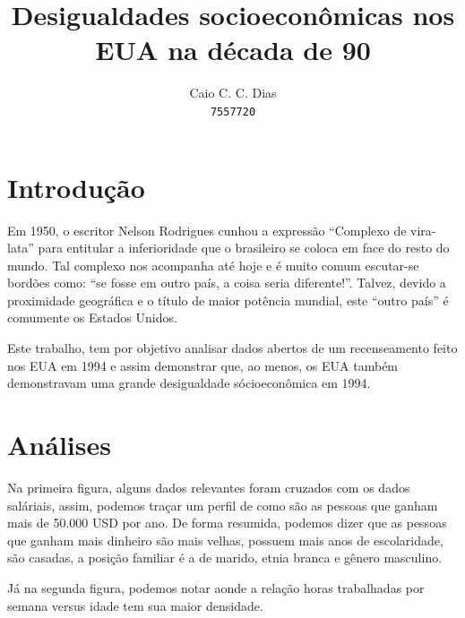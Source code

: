 \documentclass{article}\usepackage[]{graphicx}\usepackage[]{color}
\begin{document}
\title{Desigualdades socioeconômicas nos EUA na década de 90}
\author{Caio C. C. Dias \\ \texttt{7557720}}
\maketitle



\section{Introdução}
\par Em 1950, o  escritor Nelson Rodrigues cunhou a expressão ``Complexo de vira-lata'' para entitular a inferioridade que o brasileiro se coloca em face do resto do mundo. Tal complexo nos acompanha até hoje e é muito comum escutar-se bordões como: ``se fosse em outro país, a coisa seria diferente!''. Talvez, devido a proximidade geográfica e o título de maior potência mundial, este ``outro país'' é comumente os Estados Unidos.
\par Este trabalho, tem por objetivo analisar dados abertos de um recenseamento feito nos EUA em 1994 e assim demonstrar que, ao menos, os EUA também demonstravam uma grande desigualdade sócioeconômica em 1994.

\section{Análises}
\par Na primeira figura, alguns dados relevantes foram cruzados com os dados saláriais, assim, podemos traçar um perfil de como são as pessoas que ganham mais de 50.000 USD por ano. De forma resumida, podemos dizer que as pessoas que ganham mais dinheiro são mais velhas, possuem mais anos de escolaridade, são casadas, a posição familiar é a de marido, etnia branca e gênero masculino.
\par Já na segunda figura, podemos notar aonde a relação horas trabalhadas por semana versus idade tem sua maior densidade.
\end{document}
